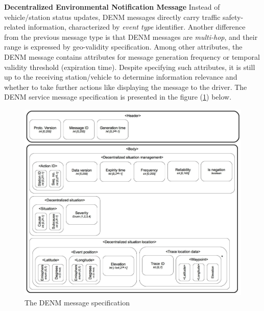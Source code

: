 \documentclass[main.tex]{subfiles}
\begin{document}
\textbf{Decentralized Environmental Notification Message}\smallskip\newline
Instead of vehicle/station status updates, DENM messages directly carry traffic safety-related 
information, characterized by \emph{event type} identifier. Another difference from the previous 
message type is that DENM messages are \emph{multi-hop}, and their range is expressed by geo-validity 
specification. Among other attributes, the DENM message contains attributes for message generation 
frequency or temporal validity threshold (expiration time). Despite specifying such 
attributes, it is still up to the receiving station/vehicle to determine information relevance
\cite{ETSI2019} and whether to take further actions like displaying the message to the driver.
The DENM service message specification is presented in the figure (\ref{denm-spec}) below.

\begin{figure}[htbp]
    \centering
    \includegraphics[width=.9\textwidth]{denm-spec.png}
    \caption{The DENM message specification \cite{Santa2013}}
    \label{denm-spec}
\end{figure}
\end{document}
